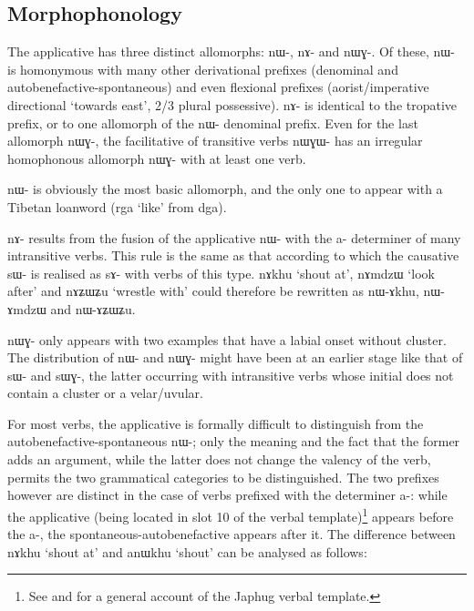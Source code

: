 \documentclass[oldfontcommands,twoside,a4paper,12pt]{article}
\newcommand{\ipa}[1]{{\phon \mbox{#1}}} %
\begin{document}
\subsection{Morphophonology} \label{sec:appl.morphophon}
The applicative  has three distinct allomorphs: \ipa{nɯ-}, \ipa{nɤ-} and \ipa{nɯɣ-}. Of these, \ipa{nɯ-} is homonymous with many other derivational prefixes (denominal and autobenefactive-spontaneous) and even flexional prefixes (aorist/imperative directional `towards east', 2/3 plural possessive). \ipa{nɤ-} is identical to the tropative prefix, or to one allomorph of the \ipa{nɯ-} denominal prefix. Even for the last allomorph \ipa{nɯɣ-}, the facilitative of transitive verbs \ipa{nɯɣɯ-} has an irregular homophonous allomorph \ipa{nɯɣ-} with at least one verb. 

\ipa{nɯ-} is obviously the most basic allomorph, and the only one to appear with a Tibetan loanword (\ipa{rga} `like' from \ipa{dga}). 

\ipa{nɤ-} results from the fusion of the applicative \ipa{nɯ-} with the \ipa{a-} determiner of many intransitive verbs. This rule is the same as that according to which the causative \ipa{sɯ-} is realised as \ipa{sɤ-} with verbs of this type. \ipa{nɤkhu} `shout at', \ipa{nɤmdzɯ} `look after' and \ipa{nɤʑɯʑu} `wrestle with' could therefore be rewritten as \ipa{nɯ-ɤkhu}, \ipa{nɯ-ɤmdzɯ} and \ipa{nɯ-ɤʑɯʑu}.

\ipa{nɯɣ-} only appears with two examples that have a labial onset without cluster. The distribution of \ipa{nɯ-} and \ipa{nɯɣ-} might have been at an earlier stage like that of \ipa{sɯ-} and \ipa{sɯɣ-}, the latter occurring with intransitive verbs whose initial does not contain a cluster or a velar/uvular. 

For most verbs, the applicative is formally difficult to distinguish from the autobenefactive-spontaneous \ipa{nɯ-}; only the meaning and the fact that the former adds an argument, while the latter does not change the valency of  the verb, permits the two grammatical categories to be distinguished. The two prefixes however are distinct in the case of verbs prefixed with the determiner \ipa{a-}: while the applicative (being located in slot 10 of the verbal template)\footnote{See \citet{jacques12incorp} and \citet{jacques13harmonization} for a general account of the Japhug verbal template.} appears \ipa{before} the \ipa{a-}, the spontaneous-autobenefactive appears after it. The difference between \ipa{nɤkhu} `shout at' and \ipa{anɯkhu} `shout' can be analysed as follows:
\end{document}
